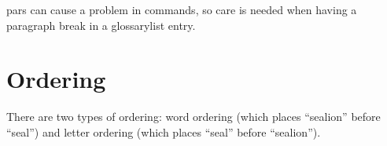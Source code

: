 \documentclass[a4paper]{report}
\begin{document}
\Glspl{par} can cause a problem in commands, so care is needed
when having a paragraph break in a \gls{glossarylist} entry.

\chapter{Ordering}

There are two types of ordering: word ordering (which places
``\gls{sealion}'' before ``\gls{seal}'') and letter ordering
(which places ``\gls{seal}'' before ``\gls{sealion}'').
\end{document}
